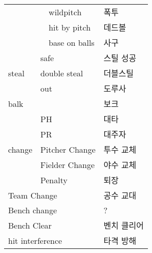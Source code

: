 \documentclass[twoside]{article}
\begin{document}
\begin{table}[]
\begin{tabular}{|l|l|l|l|l|}
                            &                         & \multicolumn{2}{l|}{wildpitch}        &  폭투   \\ \cline{3-5} 
                            &                         & \multicolumn{2}{l|}{hit by pitch}     &  데드볼   \\ \cline{3-5} 
                            &                         & \multicolumn{2}{l|}{base on balls}    &  사구   \\ \hline
\multirow{3}{*}{steal}      & \multicolumn{3}{l|}{safe}                                       &  스틸 성공  \\ \cline{2-5} 
							& \multicolumn{3}{l|}{double steal}								  &  더블스틸 \\ \cline{2-5}
                            & \multicolumn{3}{l|}{out}                                        &  도루사    \\ \hline
\multicolumn{4}{|l|}{balk}                                                                    &  보크   \\ \hline
\multirow{5}{*}{change}     & \multicolumn{3}{l|}{PH}                                         &  대타   \\ \cline{2-5} 
                            & \multicolumn{3}{l|}{PR}                                         &  대주자   \\ \cline{2-5} 
                            & \multicolumn{3}{l|}{Pitcher Change}                             &  투수 교체   \\ \cline{2-5} 
                            & \multicolumn{3}{l|}{Fielder Change}                             &  야수 교체   \\ \cline{2-5} 
                            & \multicolumn{3}{l|}{Penalty}                                    &  퇴장   \\ \hline 
\multicolumn{4}{|l|}{Team Change}                                                             &  공수 교대   \\ \hline
\multicolumn{4}{|l|}{Bench change}                                                            &  ?   \\ \hline
\multicolumn{4}{|l|}{Bench Clear}                                                             &  벤치 클리어   \\ \hline
\multicolumn{4}{|l|}{hit interference}                                                        &  타격 방해   \\ \hline
\end{tabular}
\end{table}
\end{document}
